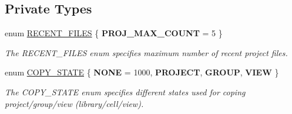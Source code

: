 \subsection*{Private Types}
\begin{DoxyCompactItemize}
\item 
enum \hyperlink{classMainWindow_aacc2f9b3beef5cc127f1234c65e3c21b}{R\-E\-C\-E\-N\-T\-\_\-\-F\-I\-L\-E\-S} \{ {\bfseries P\-R\-O\-J\-\_\-\-M\-A\-X\-\_\-\-C\-O\-U\-N\-T} = 5
 \}
\begin{DoxyCompactList}\small\item\em The R\-E\-C\-E\-N\-T\-\_\-\-F\-I\-L\-E\-S enum specifies maximum number of recent project files. \end{DoxyCompactList}\item 
enum \hyperlink{classMainWindow_afed3bafbe5c97894b6661920e82526f9}{C\-O\-P\-Y\-\_\-\-S\-T\-A\-T\-E} \{ {\bfseries N\-O\-N\-E} = 1000, 
{\bfseries P\-R\-O\-J\-E\-C\-T}, 
{\bfseries G\-R\-O\-U\-P}, 
{\bfseries V\-I\-E\-W}
 \}
\begin{DoxyCompactList}\small\item\em The C\-O\-P\-Y\-\_\-\-S\-T\-A\-T\-E enum specifies different states used for coping project/group/view (library/cell/view). \end{DoxyCompactList}\end{DoxyCompactItemize}
